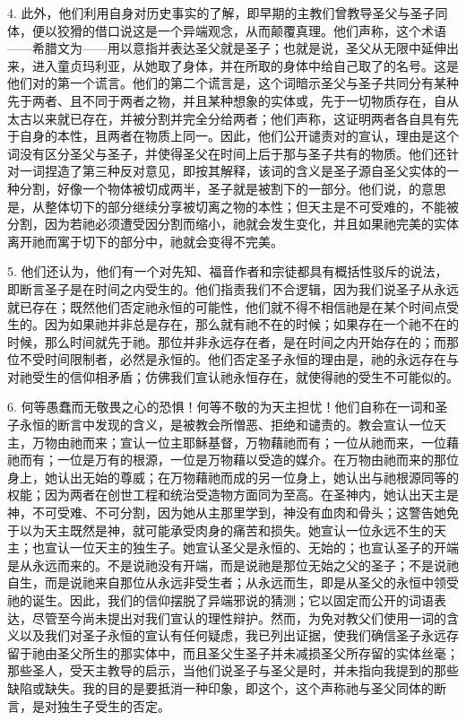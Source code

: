4. 此外，他们利用自身对历史事实的了解，即早期的主教们曾教导圣父与圣子同体，便以狡猾的借口说这是一个异端观念，从而颠覆真理。他们声称，这个术语——希腊文为——用以意指并表达圣父就是圣子；也就是说，圣父从无限中延伸出来，进入童贞玛利亚，从她取了身体，并在所取的身体中给自己取了的名号。这是他们对的第一个谎言。他们的第二个谎言是，这个词暗示圣父与圣子共同分有某种先于两者、且不同于两者之物，并且某种想象的实体或，先于一切物质存在，自从太古以来就已存在，并被分割并完全分给两者；他们声称，这证明两者各自具有先于自身的本性，且两者在物质上同一。因此，他们公开谴责对的宣认，理由是这个词没有区分圣父与圣子，并使得圣父在时间上后于那与圣子共有的物质。他们还针对一词捏造了第三种反对意见，即按其解释，该词的含义是圣子源自圣父实体的一种分割，好像一个物体被切成两半，圣子就是被割下的一部分。他们说，的意思是，从整体切下的部分继续分享被切离之物的本性；但天主是不可受难的，不能被分割，因为若祂必须遭受因分割而缩小，祂就会发生变化，并且如果祂完美的实体离开祂而寓于切下的部分中，祂就会变得不完美。\par

5. 他们还认为，他们有一个对先知、福音作者和宗徒都具有概括性驳斥的说法，即断言圣子是在时间之内受生的。他们指责我们不合逻辑，因为我们说圣子从永远就已存在；既然他们否定祂永恒的可能性，他们就不得不相信祂是在某个时间点受生的。因为如果祂并非总是存在，那么就有祂不在的时候；如果存在一个祂不在的时候，那么时间就先于祂。那位并非永远存在者，是在时间之内开始存在的；而那位不受时间限制者，必然是永恒的。他们否定圣子永恒的理由是，祂的永远存在与对祂受生的信仰相矛盾；仿佛我们宣认祂永恒存在，就使得祂的受生不可能似的。\par

6. 何等愚蠢而无敬畏之心的恐惧！何等不敬的为天主担忧！他们自称在一词和圣子永恒的断言中发现的含义，是被教会所憎恶、拒绝和谴责的。教会宣认一位天主，万物由祂而来；宣认一位主耶稣基督，万物藉祂而有；一位从祂而来，一位藉祂而有；一位是万有的根源，一位是万物藉以受造的媒介。在万物由祂而来的那位身上，她认出无始的尊威；在万物藉祂而成的另一位身上，她认出与祂根源同等的权能；因为两者在创世工程和统治受造物方面同为至高。在圣神内，她认出天主是神，不可受难、不可分割，因为她从主那里学到，神没有血肉和骨头；这警告她免于以为天主既然是神，就可能承受肉身的痛苦和损失。她宣认一位永远不生的天主；也宣认一位天主的独生子。她宣认圣父是永恒的、无始的；也宣认圣子的开端是从永远而来的。不是说祂没有开端，而是说祂是那位无始之父的圣子；不是说祂自生，而是说祂来自那位从永远非受生者；从永远而生，即是从圣父的永恒中领受祂的诞生。因此，我们的信仰摆脱了异端邪说的猜测；它以固定而公开的词语表达，尽管至今尚未提出对我们宣认的理性辩护。然而，为免对教父们使用一词的含义以及我们对圣子永恒的宣认有任何疑虑，我已列出证据，使我们确信圣子永远存留于祂由圣父所生的那实体中，而且圣父生圣子并未减损圣父所存留的实体丝毫；那些圣人，受天主教导的启示，当他们说圣子与圣父是时，并未指向我提到的那些缺陷或缺失。我的目的是要抵消一种印象，即这个，这个声称祂与圣父同体的断言，是对独生子受生的否定。\par

